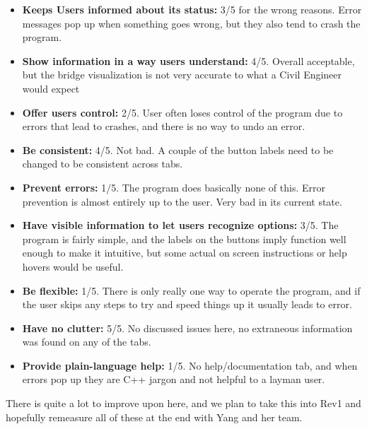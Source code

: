 \documentclass[12pt, titlepage]{article}
\begin{document}
\begin{itemize}
\item \textbf{Keeps Users informed about its status:} 3/5 for the wrong reasons. Error messages pop up when something goes wrong, but they also tend to crash the program.\\
\item \textbf{Show information in a way users understand:} 4/5. Overall acceptable, but the bridge visualization is not very accurate to what a Civil Engineer would expect\\
\item \textbf{Offer users control:} 2/5. User often loses control of the program due to errors that lead to crashes, and there is no way to undo an error.\\
\item \textbf{Be consistent:} 4/5. Not bad. A couple of the button labels need to be changed to be consistent across tabs.\\
\item \textbf{Prevent errors:} 1/5. The program does basically none of this. Error prevention is almost entirely up to the user. Very bad in its current state.\\
\item \textbf{Have visible information to let users recognize options:} 3/5. The program is fairly simple, and the labels on the buttons imply function well enough to make it
intuitive, but some actual on screen instructions or help hovers would be useful.\\
\item \textbf{Be flexible:} 1/5. There is only really one way to operate the program, and if the user skips any steps to try and speed things up it usually leads to error.\\
\item \textbf{Have no clutter:} 5/5. No discussed issues here, no extraneous information was found on any of the tabs.\\
\item \textbf{Provide plain-language help:} 1/5. No help/documentation tab, and when errors pop up they are C++ jargon and not helpful to a layman user.\\
\end{itemize}
There is quite a lot to improve upon here, and we plan to take this into Rev1 and hopefully remeasure all of these at the end with Yang and her team.
\end{document}
